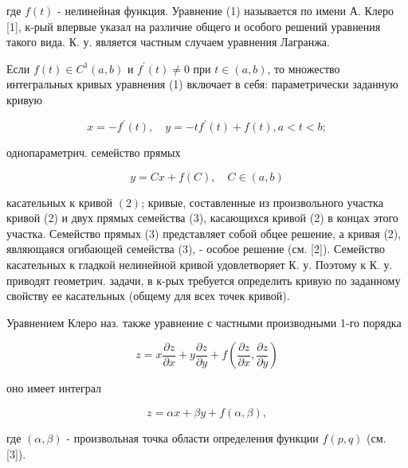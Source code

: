 \documentclass[10pt]{article}
\begin{document}
где $f(t)$ - нелинейная функция. Уравнение (1) называется по имени А. Клеро [1], к-рый впервые указал на различие общего и особого решений уравнения такого вида. К. у. является частным случаем уравнения Лагранжа.



Если $f(t) \in C^{1}(a, b)$ и $f^{\prime}(t) \neq 0$ при $t \in(a, b)$, то множество интегральных кривых уравнения (1) включает в себя: параметрически заданную кривую



\[

x=-f^{\prime}(t), \quad y=-t f^{\prime}(t)+f(t), a<t<b ;

\]



однопараметрич. семейство прямых



\[

y=C x+f(C), \quad C \in(a, b)

\]



касательных к кривой $(2)$; кривые, составленные из произвольного участка кривой (2) и двух прямых семейства (3), касающихся кривой (2) в концах этого участка. Семейство прямых (3) представляет собой обцее решение, а кривая (2), являющаяся огибающей семейства (3), - особое решение (см. [2]). Семейство касательных к гладкой нелинейной кривой удовлетворяет К. у. Поэтому к К. у. приводят геометрич. задачи, в к-рых требуется определить кривую по заданному свойству ее касательных (общему для всех точек кривой).



Уравнением Клеро наз. также уравнение с частными производными 1-го порядка



\[

z=x \frac{\partial z}{\partial x}+y \frac{\partial z}{\partial y}+f\left(\frac{\partial z}{\partial x}, \frac{\partial z}{\partial y}\right)

\]



оно имеет интеграл



\[

z=\alpha x+\beta y+f(\alpha, \beta),

\]



где $(\alpha, \beta)$ - произвольная точка области определения функции $f(p, q)$ (см. [3]).
\end{document}
